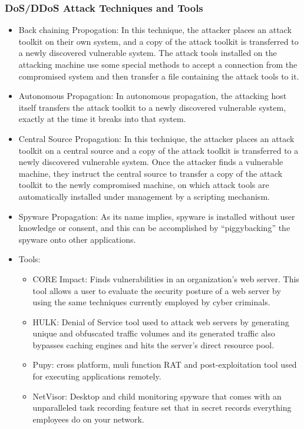 \subsubsection{DoS/DDoS Attack Techniques and Tools}
\begin{itemize}
    \item Back chaining Propogation: In this technique, the attacker places an attack toolkit on their own system, and a copy of the attack toolkit is transferred to a newly discovered vulnerable system. The attack tools installed on the attacking machine use some special methods to accept a connection from the compromised system and then transfer a file containing the attack tools to it.
    \item Autonomous Propagation: In autonomous propagation, the attacking host itself transfers the attack toolkit to a newly discovered vulnerable system, exactly at the time it breaks into that system.
    \item Central Source Propagation: In this technique, the attacker places an attack toolkit on a central source and a copy of the attack toolkit is transferred to a newly discovered vulnerable system. Once the attacker finds a vulnerable machine, they instruct the central source to transfer a copy of the attack toolkit to the newly compromised machine, on which attack tools are automatically installed under management by a scripting mechanism.
    \item Spyware Propagation: As its name implies, spyware is installed without user knowledge or consent, and this can be accomplished by “piggybacking” the spyware onto other applications.
    \item Tools:
    \begin{itemize}
        \item CORE Impact: Finds vulnerabilities in an organization's web server. This tool allows a user to evaluate the security posture of a web server by using the same techniques currently employed by cyber criminals.
        \item HULK: Denial of Service tool used to attack web servers by generating unique and obfuscated traffic volumes and its generated traffic also bypasses caching engines and hits the server's direct resource pool.
        \item Pupy: cross platform, muli function RAT and post-exploitation tool used for executing applications remotely.
        \item NetVisor: Desktop and child monitoring spyware that comes with an unparalleled task recording feature set that in secret records everything employees do on your network.

\end{itemize}
\end{itemize}
